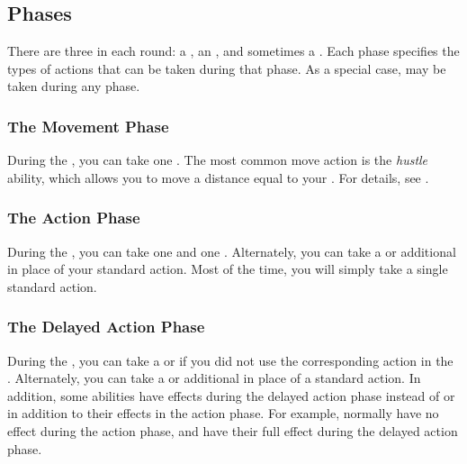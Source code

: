     \subsection{Phases}\label{Phases}

        There are three  in each round: a , an , and sometimes a .
        Each phase specifies the types of actions that can be taken during that phase.
        As a special case,  may be taken during any phase.

        \subsubsection{The Movement Phase}\label{The Movement Phase}
            During the , you can take one .
            The most common move action is the \textit{hustle} ability, which allows you to move a distance equal to your .
            For details, see .

        \subsubsection{The Action Phase}\label{The Action Phase}
            During the , you can take one  and one .
            Alternately, you can take a  or additional  in place of your standard action.
            Most of the time, you will simply take a single standard action.

        \subsubsection{The Delayed Action Phase}\label{The Delayed Action Phase}
            During the , you can take a  or  if you did not use the corresponding action in the .
            Alternately, you can take a  or additional  in place of a standard action.
            In addition, some abilities have effects during the delayed action phase instead of or in addition to their effects in the action phase.
            For example,  normally have no effect during the action phase, and have their full effect during the delayed action phase.

